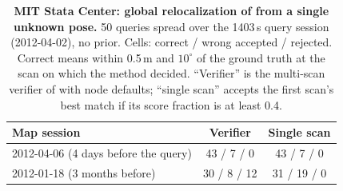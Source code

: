 \begin{table}[t]
\centering
\caption{\textbf{MIT Stata Center: global relocalization of  from a single unknown pose.} 50 queries spread over the 1403\,s query session (2012-04-02), no prior. Cells: correct / wrong accepted / rejected. Correct means within 0.5\,m and $10^\circ$ of the ground truth at the scan on which the method decided. ``Verifier'' is the multi-scan verifier of  with node defaults; ``single scan'' accepts the first scan's best match if its score fraction is at least 0.4.}\label{tab:statareloc}
\small
\begin{tabular}{@{}lcc@{}}
\toprule
Map session & Verifier & Single scan \\
\midrule
2012-04-06 (4 days before the query) & 43 / 7 / 0 & 43 / 7 / 0 \\
2012-01-18 (3 months before) & 30 / 8 / 12 & 31 / 19 / 0 \\
\bottomrule
\end{tabular}
\end{table}
